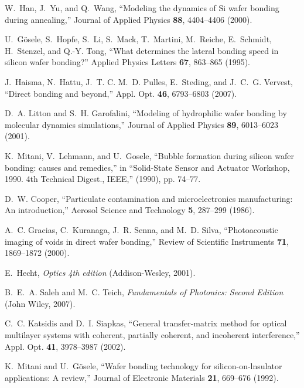 \documentclass[osajnl,twocolumn,showpacs,superscriptaddress,11pt]{revtex4-1} %
\begin{document}
\begin{thebibliography}{10}
W.~{Han}, J.~{Yu}, and Q.~{Wang}, \enquote{{Modeling the dynamics of Si wafer
  bonding during annealing},} Journal of Applied Physics \textbf{88},
  4404--4406 (2000).

U.~{G{\"o}sele}, S.~{Hopfe}, S.~{Li}, S.~{Mack}, T.~{Martini}, M.~{Reiche},
  E.~{Schmidt}, H.~{Stenzel}, and Q.-Y. {Tong}, \enquote{{What determines the
  lateral bonding speed in silicon wafer bonding?}} Applied Physics Letters
  \textbf{67}, 863--865 (1995).

J.~Haisma, N.~Hattu, J.~T. C. M.~D. Pulles, E.~Steding, and J.~C.~G. Vervest,
  \enquote{Direct bonding and beyond,} Appl. Opt. \textbf{46}, 6793--6803
  (2007).

D.~A. {Litton} and S.~H. {Garofalini}, \enquote{{Modeling of hydrophilic wafer
  bonding by molecular dynamics simulations},} Journal of Applied Physics
  \textbf{89}, 6013--6023 (2001).

K.~Mitani, V.~Lehmann, and U.~Gosele, \enquote{Bubble formation during silicon
  wafer bonding: causes and remedies,} in \enquote{Solid-State Sensor and
  Actuator Workshop, 1990. 4th Technical Digest., IEEE,}  (1990), pp. 74--77.

D.~W. Cooper, \enquote{Particulate contamination and microelectronics
  manufacturing: An introduction,} Aerosol Science and Technology \textbf{5},
  287--299 (1986).

A.~C. {Gracias}, C.~{Kuranaga}, J.~R. {Senna}, and M.~D. {Silva},
  \enquote{{Photoacoustic imaging of voids in direct wafer bonding},} Review of
  Scientific Instruments \textbf{71}, 1869--1872 (2000).

E.~{Hecht}, \emph{{Optics 4th edition}} (Addison-Wesley, 2001).

B.~E.~A. {Saleh} and M.~C. {Teich}, \emph{{Fundamentals of Photonics: Second
  Edition}} (John Wiley, 2007).

C.~C. Katsidis and D.~I. Siapkas, \enquote{General transfer-matrix method for
  optical multilayer systems with coherent, partially coherent, and incoherent
  interference,} Appl. Opt. \textbf{41}, 3978--3987 (2002).

K.~Mitani and U.~G\"osele, \enquote{Wafer bonding technology for
  silicon-on-lnsulator applications: A review,} Journal of Electronic Materials
  \textbf{21}, 669--676 (1992).


\end{thebibliography}
\end{document}
